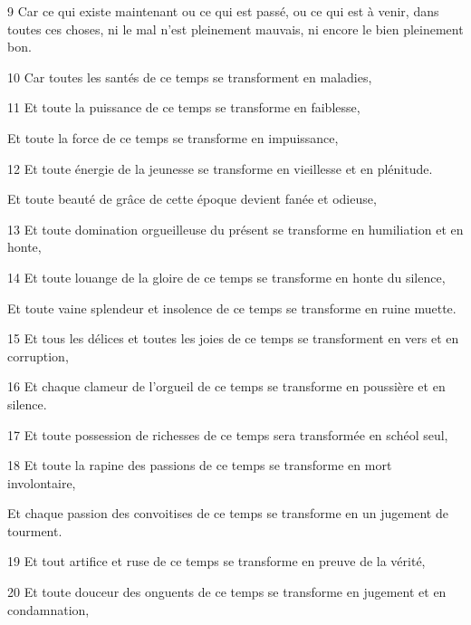 \par 9 Car ce qui existe maintenant ou ce qui est passé, ou ce qui est à venir, dans toutes ces choses, ni le mal n'est pleinement mauvais, ni encore le bien pleinement bon.

\par 10 Car toutes les santés de ce temps se transforment en maladies,

\par 11 Et toute la puissance de ce temps se transforme en faiblesse,

\par Et toute la force de ce temps se transforme en impuissance,

\par 12 Et toute énergie de la jeunesse se transforme en vieillesse et en plénitude.

\par Et toute beauté de grâce de cette époque devient fanée et odieuse,

\par 13 Et toute domination orgueilleuse du présent se transforme en humiliation et en honte,

\par 14 Et toute louange de la gloire de ce temps se transforme en honte du silence,

\par Et toute vaine splendeur et insolence de ce temps se transforme en ruine muette.

\par 15 Et tous les délices et toutes les joies de ce temps se transforment en vers et en corruption,

\par 16 Et chaque clameur de l'orgueil de ce temps se transforme en poussière et en silence.

\par 17 Et toute possession de richesses de ce temps sera transformée en schéol seul,

\par 18 Et toute la rapine des passions de ce temps se transforme en mort involontaire,

\par Et chaque passion des convoitises de ce temps se transforme en un jugement de tourment.

\par 19 Et tout artifice et ruse de ce temps se transforme en preuve de la vérité,

\par 20 Et toute douceur des onguents de ce temps se transforme en jugement et en condamnation,

